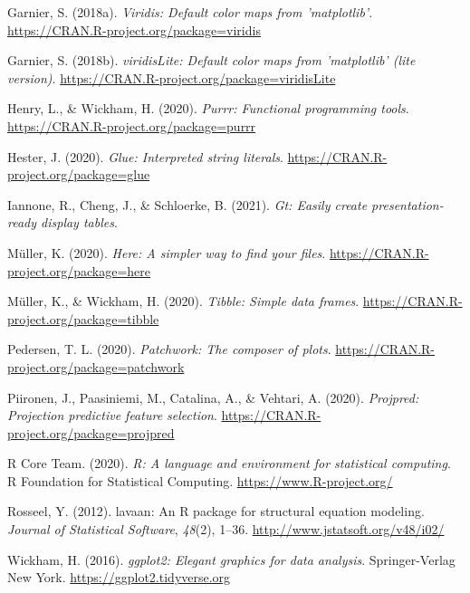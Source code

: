 \documentclass[
  man]{apa6}
\newlength{\cslhangindent}
\newlength{\cslentryspacingunit} %
\newenvironment{CSLReferences}[2] %
 {%
  \setlength{\parindent}{0pt}
  \ifodd #1
  \let\oldpar\par
  \def\par{\hangindent=\cslhangindent\oldpar}
  \fi
  \setlength{\parskip}{#2\cslentryspacingunit}
 }%
 {}
\begin{document}
\begin{CSLReferences}{1}{0}
\leavevmode{}%
Garnier, S. (2018a). \emph{Viridis: Default color maps from 'matplotlib'}. \url{https://CRAN.R-project.org/package=viridis}

\leavevmode{}%
Garnier, S. (2018b). \emph{viridisLite: Default color maps from 'matplotlib' (lite version)}. \url{https://CRAN.R-project.org/package=viridisLite}

\leavevmode{}%
Henry, L., \& Wickham, H. (2020). \emph{Purrr: Functional programming tools}. \url{https://CRAN.R-project.org/package=purrr}

\leavevmode{}%
Hester, J. (2020). \emph{Glue: Interpreted string literals}. \url{https://CRAN.R-project.org/package=glue}

\leavevmode{}%
Iannone, R., Cheng, J., \& Schloerke, B. (2021). \emph{Gt: Easily create presentation-ready display tables}.

\leavevmode{}%
Müller, K. (2020). \emph{Here: A simpler way to find your files}. \url{https://CRAN.R-project.org/package=here}

\leavevmode{}%
Müller, K., \& Wickham, H. (2020). \emph{Tibble: Simple data frames}. \url{https://CRAN.R-project.org/package=tibble}

\leavevmode{}%
Pedersen, T. L. (2020). \emph{Patchwork: The composer of plots}. \url{https://CRAN.R-project.org/package=patchwork}

\leavevmode{}%
Piironen, J., Paasiniemi, M., Catalina, A., \& Vehtari, A. (2020). \emph{Projpred: Projection predictive feature selection}. \url{https://CRAN.R-project.org/package=projpred}

\leavevmode{}%
R Core Team. (2020). \emph{R: A language and environment for statistical computing}. R Foundation for Statistical Computing. \url{https://www.R-project.org/}

\leavevmode{}%
Rosseel, Y. (2012). {lavaan}: An {R} package for structural equation modeling. \emph{Journal of Statistical Software}, \emph{48}(2), 1--36. \url{http://www.jstatsoft.org/v48/i02/}

\leavevmode{}%
Wickham, H. (2016). \emph{ggplot2: Elegant graphics for data analysis}. Springer-Verlag New York. \url{https://ggplot2.tidyverse.org}


\end{CSLReferences}
\end{document}
